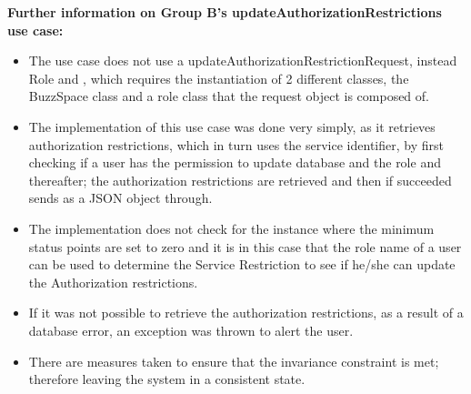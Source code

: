 \textbf{Further information on Group B's updateAuthorizationRestrictions
 use case:}
\begin{itemize}
	\item The use case does not use a updateAuthorizationRestrictionRequest, instead Role and , which requires the instantiation of 2 different classes, the BuzzSpace class and a role class that the request object is composed of.

\item The implementation of this use case was done very simply, as it retrieves authorization restrictions, which in turn uses the service identifier,  by first checking if a user has the permission to update database and the role and thereafter; the authorization restrictions are retrieved and then if succeeded sends as a JSON object through.

\item The implementation does not check for the instance where the minimum status points are set to zero and it is in this case that the role name of a user can be used to determine the Service Restriction to see if he/she can update the Authorization restrictions.

\item If it was not possible to retrieve the authorization restrictions, as a result of a database error, an exception was thrown to alert the user.

\item There are measures taken to ensure that the invariance constraint is met; therefore leaving the system in a consistent state.

\end{itemize}







